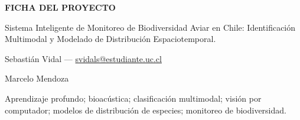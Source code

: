 
\begin{center}
  {\large\bfseries FICHA DEL PROYECTO}
\end{center}

\vspace{0.8cm}

\begin{description}[leftmargin=0pt, labelindent=0pt, labelwidth=0pt, labelsep=0pt, style=nextline, itemsep=10pt]

  \item[Título]
    Sistema Inteligente de Monitoreo de Biodiversidad Aviar en Chile:
    Identificación Multimodal y Modelado de Distribución Espaciotemporal.

  \item[Autor]
    Sebastián Vidal --- \href{mailto:svidals@estudiante.uc.cl}{svidals@estudiante.uc.cl}

  \item[Profesor Supervisor]
    Marcelo Mendoza

  \item[Temáticas (palabras clave)]
    Aprendizaje profundo; bioacústica; clasificación multimodal; visión por
    computador; modelos de distribución de especies; monitoreo de biodiversidad.

\end{description}
